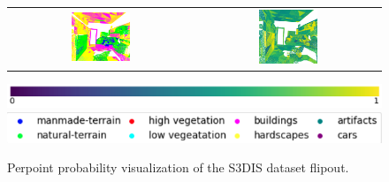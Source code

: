 \begin{figure}[h!]
\begin{tabular}{cc}
            \includegraphics[width=0.33\textwidth, height=0.18\textheight]{images/seg_output/s3dis_DE/office_42.png}& 
            \includegraphics[width=0.33\textwidth, height=0.18\textheight]{images/seg_output/s3dis_DE/fout_4.png}\\
        \end{tabular}
        \includegraphics[scale=0.45]{images/prob_legend.pdf}
        \includegraphics[scale=0.65]{images/legend.png}
        \caption{Perpoint probability visualization of the S3DIS dataset flipout.}
        \label{fig:fout_s3dis_probmap}
    \end{figure}

    \FloatBarrier
